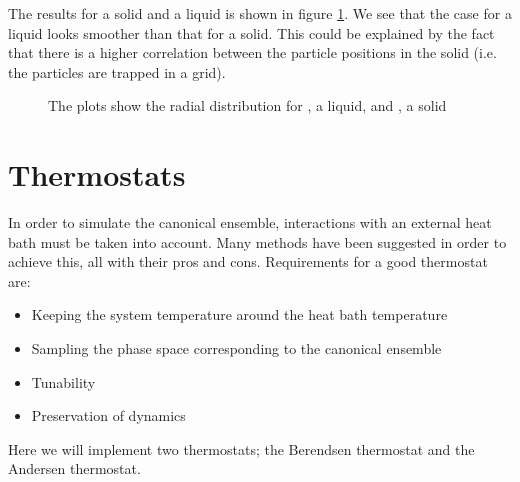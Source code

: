 \documentclass[12pt]{article}
\begin{document}
The results for a solid and a liquid is shown in figure \ref{fig:11}. We see that the case for a liquid looks smoother than that for a solid. This could be explained by the fact that there is a higher correlation between the particle positions in the solid (i.e. the particles are trapped in a grid).

\begin{figure}[ht]
\centering
{}
\caption[Optional caption for list of figures]{The plots show the radial distribution for \label{fig:subfig12}, a liquid, and \label{fig:subfig22}, a solid}
\label{fig:11}
\end{figure}

\clearpage

\section{Thermostats}
In order to simulate the canonical ensemble, interactions with an external heat bath must be taken into account. Many methods have been suggested in order to achieve this, all with their pros and cons. Requirements for a good thermostat are: 
\begin{itemize}
 \item Keeping the system temperature around the heat bath temperature
 
 \item Sampling the phase space corresponding to the canonical ensemble 
 
 \item Tunability
 
 \item Preservation of dynamics
\end{itemize}
Here we will implement two thermostats; the Berendsen thermostat and the Andersen thermostat.
\end{document}
